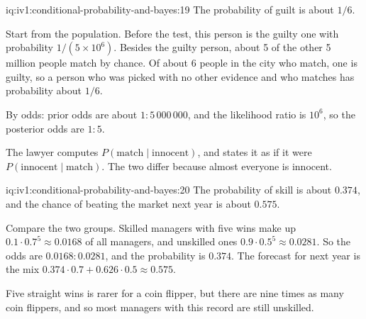 \begin{solution}{iq:iv1:conditional-probability-and-bayes:19}
The probability of guilt is about $1/6$.

Start from the population. Before the test, this person is the guilty one with probability $1/(5 \times 10^6)$. Besides the guilty person, about 5 of the other 5 million people match by chance. Of about 6 people in the city who match, one is guilty, so a person who was picked with no other evidence and who matches has probability about $1/6$.

By odds: prior odds are about $1 : 5\,000\,000$, and the likelihood ratio is $10^6$, so the posterior odds are $1 : 5$.

The lawyer computes $P(\text{match} \mid \text{innocent})$, and states it as if it were $P(\text{innocent} \mid \text{match})$. The two differ because almost everyone is innocent.

\end{solution}

\begin{solution}{iq:iv1:conditional-probability-and-bayes:20}
The probability of skill is about $0.374$, and the chance of beating the market next year is about $0.575$.

Compare the two groups. Skilled managers with five wins make up $0.1 \cdot 0.7^5 \approx 0.0168$ of all managers, and unskilled ones $0.9 \cdot 0.5^5 \approx 0.0281$. So the odds are $0.0168 : 0.0281$, and the probability is $0.374$. The forecast for next year is the mix $0.374 \cdot 0.7 + 0.626 \cdot 0.5 \approx 0.575$.

Five straight wins is rarer for a coin flipper, but there are nine times as many coin flippers, and so most managers with this record are still unskilled.

\end{solution}

